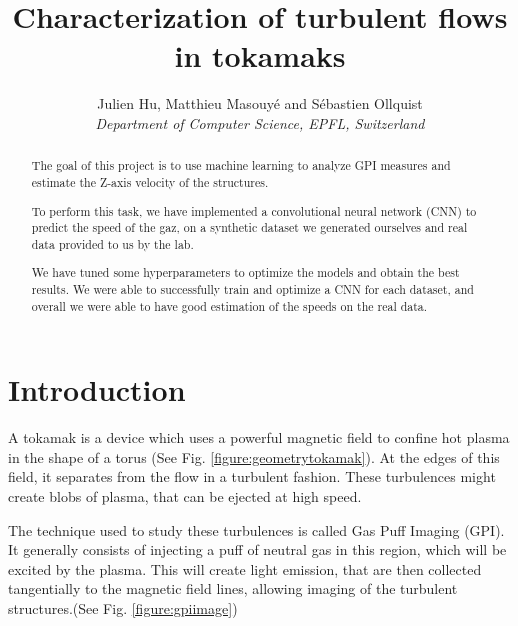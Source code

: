 \documentclass[10pt,conference]{IEEEtran}
\begin{document}
\title{Characterization of turbulent flows in tokamaks}

\author{
  Julien Hu, Matthieu Masouyé and Sébastien Ollquist\\
  \textit{Department of Computer Science, EPFL, Switzerland}
}

\maketitle
\thispagestyle{plain}
\pagestyle{plain}

\begin{abstract}
    The goal of this project is to use machine learning to analyze GPI measures and estimate the Z-axis velocity of the structures.\par 
    To perform this task, we have implemented a convolutional neural network (CNN) to predict the speed of the gaz, on a synthetic dataset we generated ourselves and real data provided to us by the lab.\par
    We have tuned some hyperparameters to optimize the models and obtain the best results. We were able to successfully train and optimize a CNN for each dataset, and overall we were able to have good estimation of the speeds on the real data. 
\end{abstract}

\section{Introduction}
A tokamak is a device which uses a powerful magnetic field to confine hot plasma in the shape of a torus\cite{wikipediatokamak} (See Fig. \ref{figure:geometrytokamak}). At the edges of this field, it separates from the flow in a turbulent fashion. These turbulences might create blobs of plasma, that can be ejected at high speed.\par 
The technique used to study these turbulences is called Gas Puff Imaging (GPI). It generally consists of injecting a puff of neutral gas in this region, which will be excited by the plasma. This will create light emission, that are then collected tangentially to the magnetic field lines, allowing imaging of the turbulent structures.(See Fig. \ref{figure:gpiimage})\par
\end{document}

